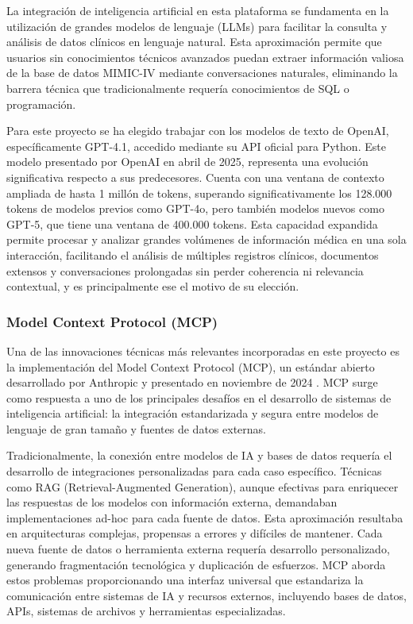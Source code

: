 La integración de inteligencia artificial en esta plataforma se fundamenta en la utilización de grandes modelos de lenguaje (LLMs) para facilitar la consulta y análisis de datos clínicos en lenguaje natural. Esta aproximación permite que usuarios sin conocimientos técnicos avanzados puedan extraer información valiosa de la base de datos MIMIC-IV mediante conversaciones naturales, eliminando la barrera técnica que tradicionalmente requería conocimientos de SQL o programación.

Para este proyecto se ha elegido trabajar con los modelos de texto de OpenAI, específicamente GPT-4.1, accedido mediante su API oficial para Python. Este modelo presentado por OpenAI en abril de 2025, representa una evolución significativa respecto a sus predecesores. Cuenta con una ventana de contexto ampliada de hasta 1 millón de tokens, superando significativamente los 128.000 tokens de modelos previos como GPT-4o, pero también modelos nuevos como GPT-5, que tiene una ventana de 400.000 tokens. Esta capacidad expandida permite procesar y analizar grandes volúmenes de información médica en una sola interacción, facilitando el análisis de múltiples registros clínicos, documentos extensos y conversaciones prolongadas sin perder coherencia ni relevancia contextual, y es principalmente ese el motivo de su elección.

\subsubsection{Model Context Protocol (MCP)}

Una de las innovaciones técnicas más relevantes incorporadas en este proyecto es la implementación del Model Context Protocol (MCP), un estándar abierto desarrollado por Anthropic y presentado en noviembre de 2024 \cite{AnthropicMCP2024}. MCP surge como respuesta a uno de los principales desafíos en el desarrollo de sistemas de inteligencia artificial: la integración estandarizada y segura entre modelos de lenguaje de gran tamaño y fuentes de datos externas.


Tradicionalmente, la conexión entre modelos de IA y bases de datos requería el desarrollo de integraciones personalizadas para cada caso específico. Técnicas como RAG (Retrieval-Augmented Generation), aunque efectivas para enriquecer las respuestas de los modelos con información externa, demandaban implementaciones ad-hoc para cada fuente de datos. Esta aproximación resultaba en arquitecturas complejas, propensas a errores y difíciles de mantener. Cada nueva fuente de datos o herramienta externa requería desarrollo personalizado, generando fragmentación tecnológica y duplicación de esfuerzos. MCP aborda estos problemas proporcionando una interfaz universal que estandariza la comunicación entre sistemas de IA y recursos externos, incluyendo bases de datos, APIs, sistemas de archivos y herramientas especializadas.


